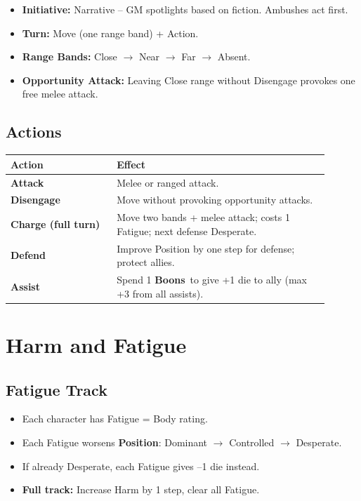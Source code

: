 \documentclass[10pt,twocolumn]{article}
\newcommand{\gameterm}[1]{\textbf{#1}\index{#1}}
\newcommand{\boons}{\gameterm{Boons}}
\newcommand{\position}{\gameterm{Position}}
\begin{document}
\begin{itemize}
    \item \textbf{Initiative:} Narrative – GM spotlights based on fiction. Ambushes act first.
    \item \textbf{Turn:} Move (one range band) + Action.
    \item \textbf{Range Bands:} Close $\rightarrow$ Near $\rightarrow$ Far $\rightarrow$ Absent.
    \item \textbf{Opportunity Attack:} Leaving Close range without Disengage provokes one free melee attack.
\end{itemize}

\subsection{Actions}
\begin{coretable}
\begin{tabular}{>{\bfseries}p{0.3\linewidth} p{0.6\linewidth}}
\toprule
\textbf{Action} & \textbf{Effect} \\
\midrule
Attack & Melee or ranged attack. \\
Disengage & Move without provoking opportunity attacks. \\
Charge (full turn) & Move two bands + melee attack; costs 1 Fatigue; next defense Desperate. \\
Defend & Improve Position by one step for defense; protect allies. \\
Assist & Spend 1 \boons\ to give +1 die to ally (max +3 from all assists). \\
\bottomrule
\end{tabular}
\end{coretable}

\section{Harm and Fatigue}

\subsection{Fatigue Track}
\begin{itemize}
    \item Each character has Fatigue = Body rating.
    \item Each Fatigue worsens \position: Dominant $\rightarrow$ Controlled $\rightarrow$ Desperate.
    \item If already Desperate, each Fatigue gives –1 die instead.
    \item \textbf{Full track:} Increase Harm by 1 step, clear all Fatigue.
\end{itemize}
\end{document}
